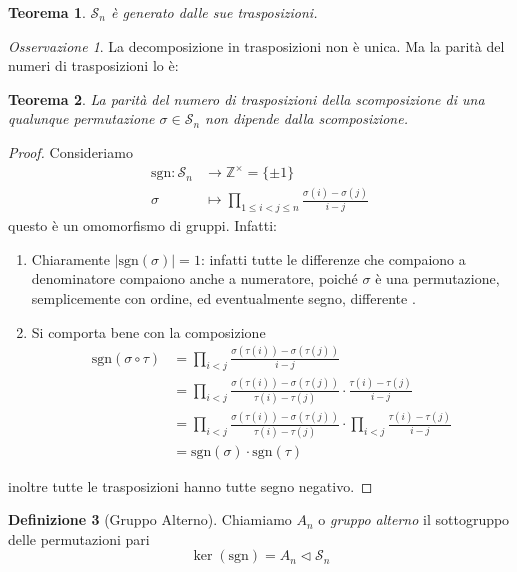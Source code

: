 \documentclass[a4paper]{article}
\newtheorem{theorem}{Teorema}[section]
\theoremstyle{remark}
\newtheorem*{remark}{Osservazione}
\theoremstyle{definition}
\newtheorem{definition}[theorem]{Definizione}
\newcommand{\fun}[5]{\begin{align*}
	#1 \colon #2 &\to #3 \\
	#4 &\mapsto #5
	\end{align*}}
\begin{document}
\begin{multicols}{2}
\begin{theorem}
	$ \mathcal{S}_n $ è generato dalle sue trasposizioni.
\end{theorem}
\begin{remark}
	La decomposizione in trasposizioni non è unica. Ma la parità del numeri di trasposizioni lo è:
\end{remark}
\begin{theorem}
	La parità del numero di trasposizioni della scomposizione di una qualunque permutazione $ \sigma \in \mathcal{S}_n $ non dipende dalla scomposizione.
\end{theorem}
\begin{proof}
	Consideriamo
	\fun{\text{sgn}}{\mathcal{S}_n}{\mathbb{Z}^\times = \{\pm 1\}}{\sigma}{\prod_{1 \leq i < j \leq n}\frac{\sigma(i)-\sigma(j)}{i-j}}
	questo è un omomorfismo di gruppi. Infatti:
	\begin{enumerate}
		\item Chiaramente $ |\text{sgn}(\sigma)| = 1 $: infatti tutte le differenze che compaiono a denominatore compaiono anche a numeratore, poiché $ \sigma $ è una permutazione, semplicemente con ordine, ed eventualmente segno, differente .
		\item Si comporta bene con la composizione
		\begin{align*}
			\text{sgn}(\sigma \circ \tau) &= \prod_{i < j}\frac{\sigma(\tau(i))-\sigma(\tau(j))}{i-j} \\
			& = \prod_{i < j}\frac{\sigma(\tau(i))-\sigma(\tau(j))}{\tau(i)-\tau(j)}\cdot \frac{\tau(i)-\tau(j)}{i-j} \\
			& = \prod_{i < j}\frac{\sigma(\tau(i))-\sigma(\tau(j))}{\tau(i)-\tau(j)}\cdot\prod_{i < j} \frac{\tau(i)-\tau(j)}{i-j}\\
			& = \text{sgn}(\sigma)\cdot \text{sgn}(\tau)
		\end{align*}
	\end{enumerate}
	inoltre tutte le trasposizioni hanno tutte segno negativo.
\end{proof}
\begin{definition}[Gruppo Alterno]
	Chiamiamo $ A_n $ o \emph{gruppo alterno} il sottogruppo delle permutazioni pari
	\[ \ker(\text{sgn}) = A_n \lhd \mathcal{S}_n \]
\end{definition}


\end{multicols}
\end{document}
